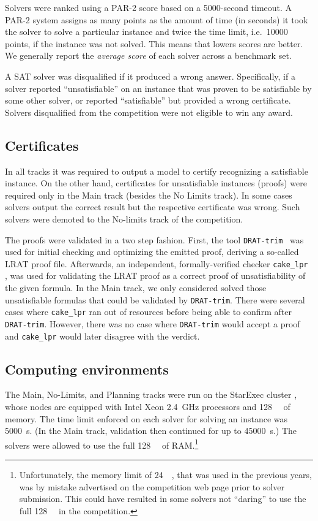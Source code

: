 \documentclass{elsarticle}
\begin{document}
Solvers were ranked using a PAR-2 score based on a \num{5000}-second timeout.
A PAR-2 system assigns as many points as the amount of time (in seconds) it took the solver
to solve a particular instance and twice the time limit, i.e.~\num{10000} points,
if the instance was not solved. This means that lowers scores are better.
We generally report the \emph{average score} of each solver across a benchmark set.

A SAT solver was disqualified if it produced a wrong answer. 
Specifically, if a solver reported ``unsatisfiable'' on an instance that 
was proven to be satisfiable by some other solver, or reported ``satisfiable'' 
but provided a wrong certificate. Solvers disqualified from the competition were
not eligible to win any award. 

\subsection{Certificates}

\label{sec:certif}

In all tracks it was required to output a model to certify recognizing a satisfiable instance.
On the other hand, certificates for unsatisfiable instances (proofs) were required only 
in the Main track (besides the No Limits track).
In some cases solvers output the correct result but the respective certificate was wrong. 
Such solvers were demoted to the No-limits track of the competition. 

The proofs were validated in a two step fashion. First, the tool {\tt DRAT-trim}~\cite{DRATtrim}
was used for initial checking and optimizing the emitted proof, deriving a so-called LRAT proof file.
Afterwards, an independent, formally-verified checker {\tt cake\_lpr} \cite{cakeLprGithub}, 
was used for validating the LRAT proof as a correct proof of unsatisfiability of the given formula.
In the Main track, we only considered solved those unsatisfiable formulas that 
could be validated by {\tt DRAT-trim}.
There were several cases where {\tt cake\_lpr} ran out of resources before being able to 
confirm after {\tt DRAT-trim}. However, there was no case where {\tt DRAT-trim} would accept
a proof and {\tt cake\_lpr} would later disagree with the verdict.


\subsection{Computing environments}

\label{sec:computing}
The Main, No-Limits, and Planning tracks were run on the StarExec cluster \cite{starexec},
whose nodes are equipped with Intel Xeon \SI{2.4}{\giga\hertz} processors 
and \SI{128}{\giga\byte} of memory.
The time limit enforced on each solver for solving an instance was \SI{5000}{\second}. 
(In the Main track, validation then continued for up to \SI{45000}{\second}.)
The solvers were allowed to use the full \SI{128}{\giga\byte} of RAM.\footnote{
Unfortunately, the memory limit of \SI{24}{\giga\byte}, that was used in the previous years,
was by mistake advertised on the competition web page prior to solver submission.
This could have resulted in some solvers not ``daring'' to use the full \SI{128}{\giga\byte}
in the competition.}
\end{document}

